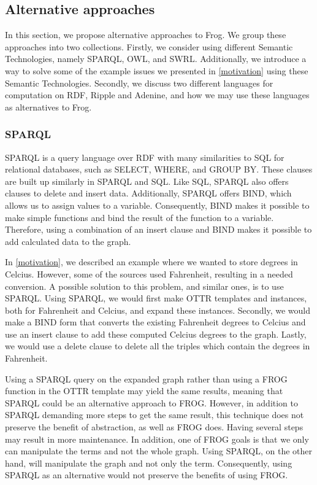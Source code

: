\subsection{Alternative approaches}
In this section, we propose alternative approaches  to Frog. We group these approaches into two collections. Firstly, we consider using different Semantic Technologies, namely SPARQL, OWL, and SWRL. Additionally, we introduce a way to solve some of the example issues we presented in \autoref{motivation} using these Semantic Technologies. Secondly, we discuss two different languages for computation on RDF, Ripple and Adenine, and how we may use these languages as alternatives to Frog.

\subsubsection{SPARQL}
SPARQL \autocite{SPARQL} is a query language over RDF with many similarities to SQL for relational databases, such as SELECT, WHERE, and GROUP BY. These clauses are built up similarly in SPARQL and SQL. Like SQL, SPARQL also offers clauses to delete and insert data. Additionally, SPARQL offers BIND, which allows us to assign values to a variable. Consequently, BIND makes it possible to make simple functions and bind the result of the function to a variable. Therefore, using a combination of an insert clause and BIND makes it possible to add calculated data to the graph.

\para
In \autoref{motivation}, we described an example where we wanted to store degrees in Celcius. However, some of the sources used Fahrenheit, resulting in a needed conversion. A possible solution to this problem, and similar ones, is to use SPARQL. Using SPARQL, we would first make OTTR templates and instances, both for Fahrenheit and Celcius, and expand these instances. Secondly, we would make a BIND form that converts the existing Fahrenheit degrees to Celcius and use an insert clause to add these computed Celcius degrees to the graph. Lastly, we would use a delete clause to delete all the triples which contain the degrees in Fahrenheit.

\para
Using a SPARQL query on the expanded graph rather than using a FROG function in the OTTR template may yield the same results, meaning that SPARQL could be an alternative approach to FROG. However, in addition to SPARQL demanding more steps to get the same result, this technique does not preserve the benefit of abstraction, as well as FROG does. Having several steps may result in more maintenance. In addition, one of FROG goals is that we only can manipulate the terms and not the whole graph. Using SPARQL, on the other hand, will manipulate the graph and not only the term. Consequently, using SPARQL as an alternative would not preserve the benefits of using FROG.

